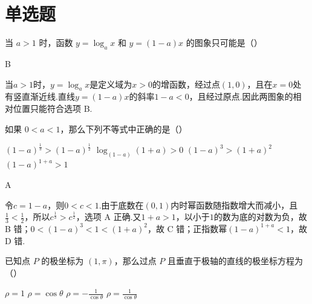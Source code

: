 \section{单选题}

\begin{problem}
当 \(a > 1\) 时，函数 \(y = \log_a x\) 和 \(y = (1 - a)x\) 的图象只可能是（\quad）

    {}
    {}
    {}
\end{problem}

\begin{answer}
B
\end{answer}

\begin{solution}
当\(a>1\)时，\(y=\log_a x\)是定义域为\(x>0\)的增函数，经过点\((1,0)\)，且在\(x=0\)处有竖直渐近线.直线\(y=(1-a)x\)的斜率\(1-a<0\)，且经过原点.因此两图象的相对位置只能符合选项 B.
\end{solution}

\begin{problem}
如果 \(0 < a < 1\)，那么下列不等式中正确的是（\quad）

\choices
    {\((1 - a)^{\frac{1}{3}} > (1 - a)^{\frac{1}{2}}\)}
    {\(\log_{(1 - a)}(1 + a) > 0\)}
    {\((1 - a)^{3} > (1 + a)^{2}\)}
    {\((1 - a)^{1 + a} > 1\)}
\end{problem}

\begin{answer}
A
\end{answer}

\begin{solution}
令\(c=1-a\)，则\(0<c<1\).由于底数在\((0,1)\)内时幂函数随指数增大而减小，且\(\frac{1}{3}<\frac{1}{2}\)，所以\(c^{\frac{1}{3}}>c^{\frac{1}{2}}\)，选项 A 正确.又\(1+a>1\)，以小于\(1\)的数为底的对数为负，故 B 错；\(0<(1-a)^3<1<(1+a)^2\)，故 C 错；正指数幂\((1-a)^{1+a}<1\)，故 D 错.
\end{solution}

\begin{problem}
已知点 \(P\) 的极坐标为 \((1, \pi)\)，那么过点 \(P\) 且垂直于极轴的直线的极坐标方程为（\quad）

\choices
    {\(\rho = 1\)}
    {\(\rho = \cos \theta\)}
    {\(\rho = -\frac{1}{\cos\theta}\)}
    {\(\rho = \frac{1}{\cos\theta}\)}
\end{problem}

